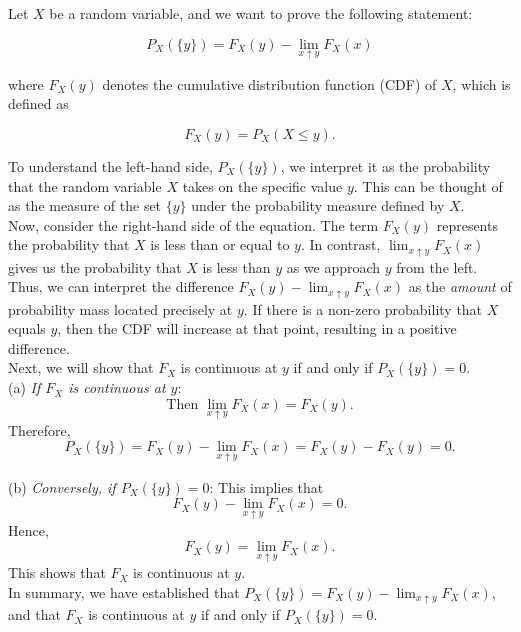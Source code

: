 \begin{solution}
Let \( X \) be a random variable, and we want to prove the following statement: 

\[
P_X(\{y\}) = F_X(y) - \lim_{x \uparrow y} F_X(x)
\]

where \( F_X(y) \) denotes the cumulative distribution function (CDF) of \( X \), which is defined as 

\[
F_X(y) = P_X(X \leq y).
\]

To understand the left-hand side, \( P_X(\{y\}) \), we interpret it as the probability that the random variable \( X \) takes on the specific value \( y \). This can be thought of as the measure of the set \( \{y\} \) under the probability measure defined by \( X \).\\

Now, consider the right-hand side of the equation. The term \( F_X(y) \) represents the probability that \( X \) is less than or equal to \( y \). In contrast, \( \lim_{x \uparrow y} F_X(x) \) gives us the probability that \( X \) is less than \( y \) as we approach \( y \) from the left.\\

Thus, we can interpret the difference \( F_X(y) - \lim_{x \uparrow y} F_X(x) \) as the \textit{amount} of probability mass located precisely at \( y \). If there is a non-zero probability that \( X \) equals \( y \), then the CDF will increase at that point, resulting in a positive difference.\\

Next, we will show that \( F_X \) is continuous at \( y \) if and only if \( P_X(\{y\}) = 0 \). \\

(a) \textit{If \( F_X \) is continuous at \( y \)}:
\[
   \text{Then } \lim_{x \uparrow y} F_X(x) = F_X(y).
   \]
   Therefore,
   \[
   P_X(\{y\}) = F_X(y) - \lim_{x \uparrow y} F_X(x) = F_X(y) - F_X(y) = 0.
   \]

(b) \textit{Conversely, if \( P_X(\{y\}) = 0 \)}:
This implies that 
   \[
   F_X(y) - \lim_{x \uparrow y} F_X(x) = 0.
   \]
   Hence,
   \[
   F_X(y) = \lim_{x \uparrow y} F_X(x).
   \]
   This shows that \( F_X \) is continuous at \( y \).\\

In summary, we have established that \( P_X(\{y\}) = F_X(y) - \lim_{x \uparrow y} F_X(x) \), and that \( F_X \) is continuous at \( y \) if and only if \( P_X(\{y\}) = 0 \). \\
\end{solution}


